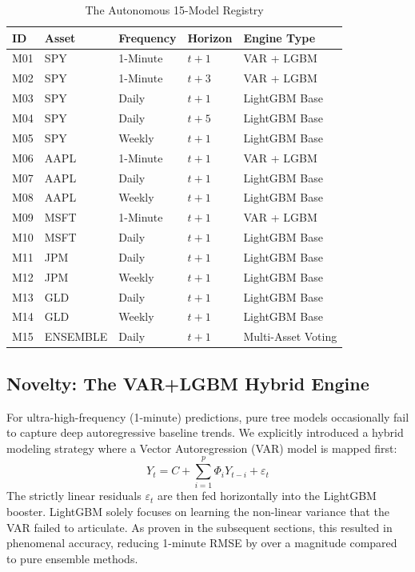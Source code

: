 \documentclass[journal,10pt,twocolumn]{IEEEtran}
\begin{document}
\begin{table}[ht]
\centering
\caption{The Autonomous 15-Model Registry}
\label{tab:models}
\begin{tabular}{@{}lllll@{}}
\toprule
\textbf{ID} & \textbf{Asset} & \textbf{Frequency} & \textbf{Horizon} & \textbf{Engine Type} \\
\midrule
M01 & SPY & 1-Minute & $t+1$ & VAR + LGBM \\
M02 & SPY & 1-Minute & $t+3$ & VAR + LGBM \\
M03 & SPY & Daily & $t+1$ & LightGBM Base \\
M04 & SPY & Daily & $t+5$ & LightGBM Base \\
M05 & SPY & Weekly & $t+1$ & LightGBM Base \\
\midrule
M06 & AAPL & 1-Minute & $t+1$ & VAR + LGBM \\
M07 & AAPL & Daily & $t+1$ & LightGBM Base \\
M08 & AAPL & Weekly & $t+1$ & LightGBM Base \\
\midrule
M09 & MSFT & 1-Minute & $t+1$ & VAR + LGBM \\
M10 & MSFT & Daily & $t+1$ & LightGBM Base \\
\midrule
M11 & JPM & Daily & $t+1$ & LightGBM Base \\
M12 & JPM & Weekly & $t+1$ & LightGBM Base \\
M13 & GLD & Daily & $t+1$ & LightGBM Base \\
M14 & GLD & Weekly & $t+1$ & LightGBM Base \\
M15 & ENSEMBLE& Daily & $t+1$ & Multi-Asset Voting \\
\bottomrule
\end{tabular}
\end{table}

\subsection{Novelty: The VAR+LGBM Hybrid Engine}
For ultra-high-frequency (1-minute) predictions, pure tree models occasionally fail to capture deep autoregressive baseline trends. We explicitly introduced a hybrid modeling strategy where a Vector Autoregression (VAR) model is mapped first:
\begin{equation}
Y_t = C + \sum_{i=1}^{p} \Phi_i Y_{t-i} + \varepsilon_t
\end{equation}
The strictly linear residuals $\varepsilon_t$ are then fed horizontally into the LightGBM booster. LightGBM solely focuses on learning the non-linear variance that the VAR failed to articulate. As proven in the subsequent sections, this resulted in phenomenal accuracy, reducing 1-minute RMSE by over a magnitude compared to pure ensemble methods.
\end{document}
